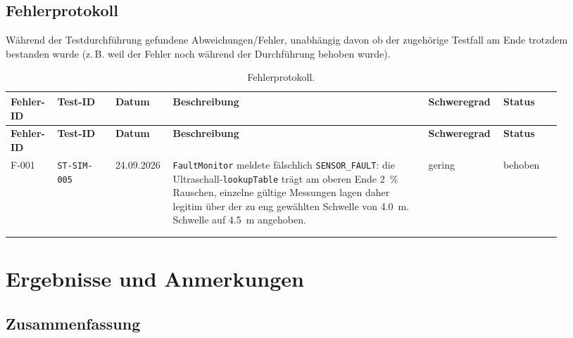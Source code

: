 \documentclass[
  a4paper,
  12pt,
  DIV=12,        %
  parskip=half,  %
  headings=small %
]{scrartcl}
\theoremstyle{definition}
\theoremstyle{definition}
\begin{document}
\begin{landscape}
\section{Fehlerprotokoll}\label{fehlerprotokoll}

Während der Testdurchführung gefundene Abweichungen/Fehler, unabhängig
davon ob der zugehörige Testfall am Ende trotzdem bestanden wurde (z.\,B.
weil der Fehler noch während der Durchführung behoben wurde).

\begin{longtable}[]{@{}p{0.08\linewidth}p{0.10\linewidth}p{0.09\linewidth}p{0.44\linewidth}p{0.10\linewidth}p{0.10\linewidth}@{}}
\caption{Fehlerprotokoll.}\\
\toprule
\textbf{Fehler-ID} & \textbf{Test-ID} & \textbf{Datum} & \textbf{Beschreibung} & \textbf{Schweregrad} & \textbf{Status}\\
\midrule
\endfirsthead
\toprule
\textbf{Fehler-ID} & \textbf{Test-ID} & \textbf{Datum} & \textbf{Beschreibung} & \textbf{Schweregrad} & \textbf{Status}\\
\midrule
\endhead
\bottomrule
\endfoot
F-001 & \texttt{ST-SIM-005} & 24.09.2026 & \texttt{FaultMonitor} meldete fälschlich \texttt{SENSOR\_FAULT}: die Ultraschall-\texttt{lookupTable} trägt am oberen Ende \SI{2}{\percent} Rauschen, einzelne gültige Messungen lagen daher legitim über der zu eng gewählten Schwelle von \SI{4.0}{\meter}. Schwelle auf \SI{4.5}{\meter} angehoben. & gering & behoben\\
 & & & & & \\
 & & & & & \\
\end{longtable}
\end{landscape}

\section{Ergebnisse und Anmerkungen}\label{ergebnisse-und-anmerkungen}

\subsection{Zusammenfassung}\label{zusammenfassung-testreport}
\end{document}
